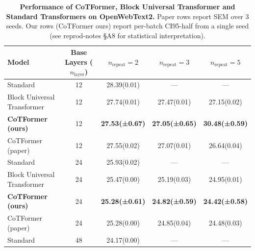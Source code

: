 \begin{table}[t]
  \centering
  \caption{\textbf{Performance of CoTFormer, Block Universal Transformer and Standard Transformers on OpenWebText2.} Paper rows report SEM over 3 seeds. Our rows (CoTFormer ours) report per-batch CI95-half from a single seed (see reprod-notes \S A8 for statistical interpretation).}
  \label{tab:table1}
  \begin{tabular}{lc ccc}
    \toprule
    Model & Base Layers ($n_{\mathrm{layer}}$) & $n_{\mathrm{repeat}}=2$ & $n_{\mathrm{repeat}}=3$ & $n_{\mathrm{repeat}}=5$ \\
    \midrule
    Standard & 12 & 28.39(0.01) & — & — \\
    Block Universal Transformer & 12 & 27.74(0.01) & 27.47(0.01) & 27.15(0.02) \\
    \textbf{CoTFormer (ours)} & 12 & \textbf{27.53(±0.67)} & \textbf{27.05(±0.65)} & \textbf{30.48(±0.59)} \\
    CoTFormer (paper) & 12 & 27.55(0.02) & 27.07(0.01) & 26.64(0.04) \\
    \midrule
    Standard & 24 & 25.93(0.02) & — & — \\
    Block Universal Transformer & 24 & 25.47(0.00) & 25.19(0.03) & 24.95(0.01) \\
    \textbf{CoTFormer (ours)} & 24 & \textbf{25.28(±0.61)} & \textbf{24.82(±0.59)} & \textbf{24.42(±0.58)} \\
    CoTFormer (paper) & 24 & 25.28(0.00) & 24.85(0.04) & 24.48(0.03) \\
    \midrule
    Standard & 48 & 24.17(0.00) & — & — \\
    \bottomrule
  \end{tabular}
\end{table}
